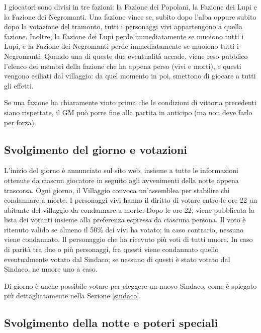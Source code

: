 \documentclass[a4paper,10pt]{article}
\begin{document}
I giocatori sono divisi in tre fazioni: la Fazione dei Popolani, la Fazione dei Lupi e la Fazione dei Negromanti.
Una fazione vince se, subito dopo l'alba oppure subito dopo la votazione del tramonto, tutti i personaggi vivi appartengono a quella fazione.
Inoltre, la Fazione dei Lupi perde immediatamente se muoiono tutti i Lupi, e la Fazione dei Negromanti perde immediatamente se muoiono tutti i Negromanti. Quando una di queste due eventualità accade, viene reso pubblico l'elenco dei membri della fazione che ha appena perso (vivi e morti), e questi vengono esiliati dal villaggio: da quel momento in poi, smettono di giocare a tutti gli effetti.

Se una fazione ha chiaramente vinto prima che le condizioni di vittoria precedenti siano rispettate, il GM può porre fine alla partita in anticipo (ma non deve farlo per forza).



\subsection{Svolgimento del giorno e votazioni}

L'inizio del giorno è annunciato sul sito web, insieme a tutte le informazioni ottenute da ciascun giocatore in seguito agli avvenimenti della notte appena trascorsa.
Ogni giorno, il Villaggio convoca un'assemblea per stabilire chi condannare a morte.
I personaggi vivi hanno il diritto di votare entro le ore 22 un abitante del villaggio da condannare a morte. Dopo le ore 22, viene pubblicata la lista dei votanti insieme alla preferenza espressa da ciascuna persona.
Il voto è ritenuto valido se almeno il 50\% dei vivi ha votato; in caso contrario, nessuno viene condannato. Il personaggio che ha ricevuto più voti di tutti muore.
In caso di parità tra due o più personaggi, fra questi viene condannato quello eventualmente votato dal Sindaco; se nessuno di questi è stato votato dal Sindaco, ne muore uno a caso.

Di giorno è anche possibile votare per eleggere un nuovo Sindaco, come è spiegato più dettagliatamente nella Sezione \ref{sindaco}.


\subsection{Svolgimento della notte e poteri speciali}
\end{document}
